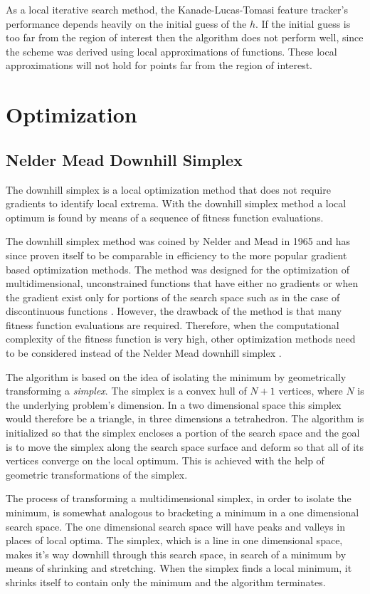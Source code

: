 \documentclass[11pt,a4paper]{report}
\begin{document}
As a local iterative search method, the Kanade-Lucas-Tomasi feature tracker's
performance depends heavily on the initial guess of the $h$. If the initial
guess is too far from the region of interest then the algorithm does not perform
well, since the scheme was derived using local approximations of
functions. These local approximations will not hold for points far from the
region of interest.


\section{Optimization}

\subsection{Nelder Mead Downhill Simplex}

The downhill simplex is a local optimization method that does not
require gradients to identify local extrema. With the downhill simplex method a
local optimum is found by means of a sequence of fitness function evaluations.

The downhill simplex method was coined by Nelder and Mead in 1965
and has since proven itself to be comparable in efficiency to the more popular 
gradient based optimization methods. The method was designed
for the optimization of multidimensional, unconstrained functions
that have either no gradients or when the gradient exist only for
portions of the search space such as in the case of discontinuous functions
\cite{Nelder2009}. However, the drawback of the method is that many fitness function evaluations
are required. Therefore, when the computational complexity of the
fitness function is very high, other optimization methods need to
be considered instead of the Nelder Mead downhill simplex \cite{Press1992}.

The algorithm is based on the idea of isolating the
minimum by geometrically transforming a \textit{simplex}. The simplex
is a convex hull of $N+1$ vertices, where $N$ is the underlying
problem's dimension. In a two dimensional space this simplex would therefore
be a triangle, in three dimensions a tetrahedron. The algorithm is initialized
so that the simplex encloses
a portion of the search space and the goal is to move the simplex along the
search space surface and deform so that all of its vertices converge on the local optimum. This is achieved with
the help of geometric transformations of the simplex.

The process of transforming a multidimensional simplex, in order to
isolate the minimum, is somewhat analogous to bracketing a minimum
in a one dimensional search space. The one dimensional search space will have
peaks and valleys in places of local optima. The simplex, which is a line in one
dimensional space, makes it's way downhill
through this search space, in search of a minimum by means of shrinking and
stretching. When the simplex finds a local minimum, it shrinks itself to contain
only the minimum and the algorithm terminates.
\end{document}
